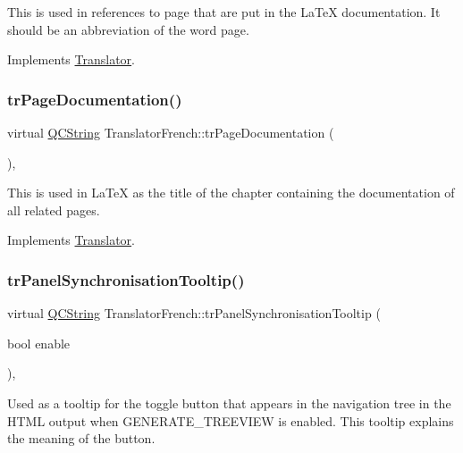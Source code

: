 This is used in references to page that are put in the La\+TeX documentation. It should be an abbreviation of the word page. 

Implements \mbox{\hyperlink{class_translator}{Translator}}.

\mbox{\label{class_translator_french_a516d95f0c1ac034feb21bd94758f23ce}} 
\subsubsection{\texorpdfstring{trPageDocumentation()}{trPageDocumentation()}}
{\footnotesize\ttfamily virtual \mbox{\hyperlink{class_q_c_string}{Q\+C\+String}} Translator\+French\+::tr\+Page\+Documentation (\begin{DoxyParamCaption}{ }\end{DoxyParamCaption})\hspace{0.3cm}{\ttfamily [inline]}, {\ttfamily [virtual]}}

This is used in La\+TeX as the title of the chapter containing the documentation of all related pages. 

Implements \mbox{\hyperlink{class_translator}{Translator}}.

\mbox{\label{class_translator_french_af6f421b6a9974ad78bf6e2221f3e3bbf}} 
\subsubsection{\texorpdfstring{trPanelSynchronisationTooltip()}{trPanelSynchronisationTooltip()}}
{\footnotesize\ttfamily virtual \mbox{\hyperlink{class_q_c_string}{Q\+C\+String}} Translator\+French\+::tr\+Panel\+Synchronisation\+Tooltip (\begin{DoxyParamCaption}\item[{bool}]{enable }\end{DoxyParamCaption})\hspace{0.3cm}{\ttfamily [inline]}, {\ttfamily [virtual]}}

Used as a tooltip for the toggle button that appears in the navigation tree in the H\+T\+ML output when G\+E\+N\+E\+R\+A\+T\+E\+\_\+\+T\+R\+E\+E\+V\+I\+EW is enabled. This tooltip explains the meaning of the button. 

